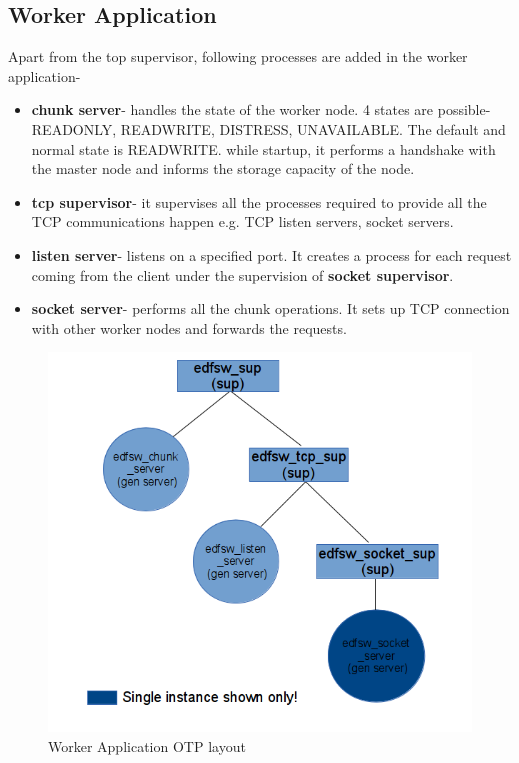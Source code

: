 \documentclass[a4paper,12pt]{article}
\begin{document}
\subsection{Worker Application}
Apart from the top supervisor, following processes are added in the worker application-
\begin{itemize}
\item \textbf{chunk server}- handles the state of the worker node. 4 states are possible- READONLY, READWRITE, DISTRESS, UNAVAILABLE. The default and normal state is READWRITE. while startup, it performs a handshake with the master node and informs the storage capacity of the node.
\item \textbf{tcp supervisor}- it supervises all the processes required to provide all the TCP communications happen e.g. TCP listen servers, socket servers.
\item \textbf{listen server}- listens on a specified port. It creates a process for each request coming from the client under the supervision of \textbf{socket supervisor}.
\item \textbf{socket server}- performs all the chunk operations. It sets up TCP connection with other worker nodes and forwards the requests.
\end{itemize}
\begin{figure}[h]
  \begin{center}
    \includegraphics[scale = 0.45]{images/worker_otp_layout}
  \end{center}
  \caption{Worker Application OTP layout}
\end{figure}
\end{document}
